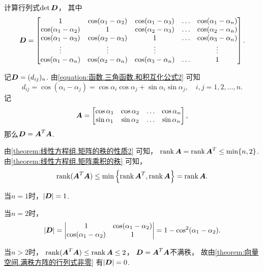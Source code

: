 \begin{example}
计算行列式\(\det\boldsymbol{D}\)，
其中\begin{equation*}
	\boldsymbol{D} = \begin{bmatrix}
		1 & \cos(\alpha_1-\alpha_2) & \cos(\alpha_1-\alpha_3) & \dots & \cos(\alpha_1-\alpha_n) \\
		\cos(\alpha_1-\alpha_2) & 1 & \cos(\alpha_2-\alpha_3) & \dots & \cos(\alpha_2-\alpha_n) \\
		\cos(\alpha_1-\alpha_3) & \cos(\alpha_2-\alpha_3) & 1 & \dots & \cos(\alpha_3-\alpha_n) \\
		\vdots & \vdots & \vdots & & \vdots \\
		\cos(\alpha_1-\alpha_n) & \cos(\alpha_2-\alpha_n) & \cos(\alpha_3-\alpha_n) & \dots & 1
	\end{bmatrix}.
\end{equation*}
\begin{solution}
记\(\boldsymbol{D} = (d_{ij})_n\).
由\cref{equation:函数.三角函数.和积互化公式2} 可知\begin{equation*}
	d_{ij} = \cos(\alpha_i-\alpha_j)
	= \cos\alpha_i\cos\alpha_j+\sin\alpha_i\sin\alpha_j,
	\quad i,j=1,2,\dotsc,n.
\end{equation*}
记\begin{equation*}
	\boldsymbol{A} = \begin{bmatrix}
		\cos\alpha_1 & \cos\alpha_2 & \dots & \cos\alpha_n \\
		\sin\alpha_1 & \sin\alpha_2 & \dots & \sin\alpha_n
	\end{bmatrix},
\end{equation*}那么\(\boldsymbol{D} = \boldsymbol{A}^T \boldsymbol{A}\).

由\cref{theorem:线性方程组.矩阵的秩的性质2} 可知，
\(\rank\boldsymbol{A} = \rank\boldsymbol{A}^T \leq \min\{n,2\}\).
由\cref{theorem:线性方程组.矩阵乘积的秩} 可知，\begin{equation*}
	\rank(\boldsymbol{A}^T\boldsymbol{A}) \leq \min\left\{\rank\boldsymbol{A}^T,\rank\boldsymbol{A}\right\} = \rank\boldsymbol{A}.
\end{equation*}

当\(n=1\)时，\(\abs{\boldsymbol{D}}=1\).

当\(n=2\)时，\begin{equation*}
	\abs{\boldsymbol{D}}
	= \begin{vmatrix}
		1 & \cos(\alpha_1-\alpha_2) \\
		\cos(\alpha_1-\alpha_2) & 1
	\end{vmatrix}
	= 1 - \cos^2(\alpha_1-\alpha_2).
\end{equation*}

当\(n>2\)时，
\(\rank(\boldsymbol{A}^T\boldsymbol{A}) \leq \rank\boldsymbol{A} \leq2\)，
\(\boldsymbol{D} = \boldsymbol{A}^T \boldsymbol{A}\)不满秩，
故由\cref{theorem:向量空间.满秩方阵的行列式非零} 有\(\abs{\boldsymbol{D}}=0\).
\end{solution}
\end{example}

